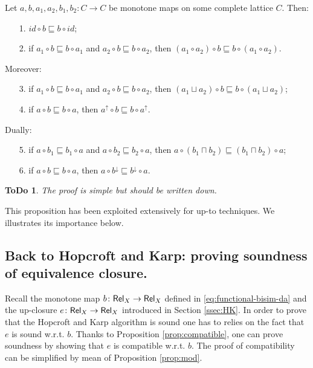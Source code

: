 \documentclass[smallcondensed,envcountsect,envcountsame]{svjour3}     %
\newtheorem{todo}[theorem]{\bf ToDo}
\begin{document}
\begin{proposition}[modularity]\label{prop:mod}
Let $a,b,a_1,a_2,b_1,b_2\colon C\to C$ be monotone maps on some complete lattice $C$. 
Then:
\begin{enumerate}
\item[1.] $id \circ b \sqsubseteq b \circ id$;
\item[2.] if  $a_1 \circ b \sqsubseteq b \circ a_1$ and $a_2 \circ b \sqsubseteq b \circ a_2$, then $(a_1 \circ a_2) \circ b \sqsubseteq b \circ (a_1 \circ a_2)$.
\end{enumerate}
Moreover:
\begin{enumerate}
\item[3.] if  $a_1 \circ b \sqsubseteq b \circ a_1$ and $a_2 \circ b \sqsubseteq b \circ a_2$, then $(a_1 \sqcup a_2) \circ b \sqsubseteq b \circ (a_1 \sqcup a_2)$;
\item[4.] if  $a \circ b \sqsubseteq b \circ a$, then $a^\uparrow \circ b \sqsubseteq b \circ a^\uparrow$.
\end{enumerate}
Dually:
\begin{enumerate}
\item[5.] if  $a \circ b_1 \sqsubseteq b_1 \circ a$ and $a \circ b_2 \sqsubseteq b_2 \circ a$, then $a\circ  (b_1 \sqcap  b_2) \sqsubseteq (b_1 \sqcap b_2) \circ a$;
\item[6.] if  $a \circ b \sqsubseteq b \circ a$, then $a \circ b^\downarrow \sqsubseteq b^\downarrow \circ a$.
\end{enumerate}
\end{proposition}
\begin{todo}
The proof is simple but should be written down.
\end{todo}

This proposition has been exploited extensively for up-to techniques. We illustrates its importance below.

 
 \subsection{Back to Hopcroft and Karp: proving soundness of equivalence closure.}\label{sec:HKsoundness}
 Recall the monotone map $b\colon \mathsf{Rel}_X \to \mathsf{Rel}_X$ defined in \eqref{eq:functional-bisim-da} and the up-closure $e\colon \mathsf{Rel}_X \to \mathsf{Rel}_X$ introduced in Section \ref{ssec:HK}.
 In order to prove that the Hopcroft and Karp algorithm is sound one has to relies on the fact that $e$ is sound w.r.t. $b$. 
 Thanks to Proposition \ref{prop:compatible}, one can prove soundness by showing that $e$ is compatible w.r.t. $b$. The proof of compatibility can be simplified by mean of Proposition \ref{prop:mod}.
\end{document}
